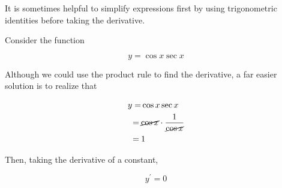 \begin{tip}
    It is sometimes helpful to simplify expressions first by using trigonometric identities before taking the derivative.
    
    Consider the function
    
    \[ y = \cos{x}\sec{x} \]
    
    Although we could use the product rule to find the derivative, a far easier solution is to realize that
    
    \begin{align}
        y = &\cos{x}\sec{x} \\
        = \> &\cancel{\cos{x}} \cdot \dfrac{1}{\cancel{\cos{x}}} \\
        = \> &1
    \end{align}
    
    Then, taking the derivative of a constant,
    
    \[ y^\prime = 0 \]
\end{tip}
